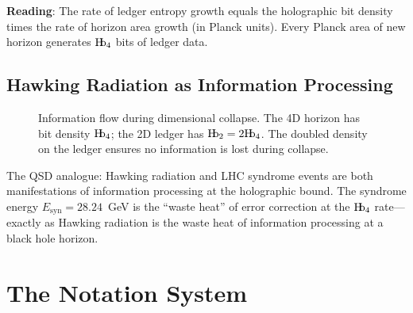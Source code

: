 \documentclass[11pt,a4paper]{article}
\theoremstyle{plain}
\theoremstyle{definition}
\newcommand{\Hb}{\textnormal{H\kern-0.3em b}}
\newcommand{\Hbfour}{\Hb_4}
\newcommand{\Hbtwo}{\Hb_2}
\newcommand{\Esyn}{E_{\text{syn}}}
\newcommand{\lp}{\ell_P}
\begin{document}
\textbf{Reading}: The rate of ledger entropy growth equals the holographic bit density times the rate of horizon area growth (in Planck units). Every Planck area of new horizon generates $\Hbfour$ bits of ledger data.

\subsection{Hawking Radiation as Information Processing}

\begin{figure}[h]
\centering
{}
\caption{Information flow during dimensional collapse. The 4D horizon has bit density $\Hbfour$; the 2D ledger has $\Hbtwo = 2\Hbfour$. The doubled density on the ledger ensures no information is lost during collapse.}
\label{fig:information_flow}
\end{figure}

The QSD analogue: Hawking radiation and LHC syndrome events are both manifestations of information processing at the holographic bound. The syndrome energy $\Esyn = 28.24$~GeV is the ``waste heat'' of error correction at the $\Hbfour$ rate---exactly as Hawking radiation is the waste heat of information processing at a black hole horizon.

\section{The Notation System}
\label{sec:notation}
\end{document}
